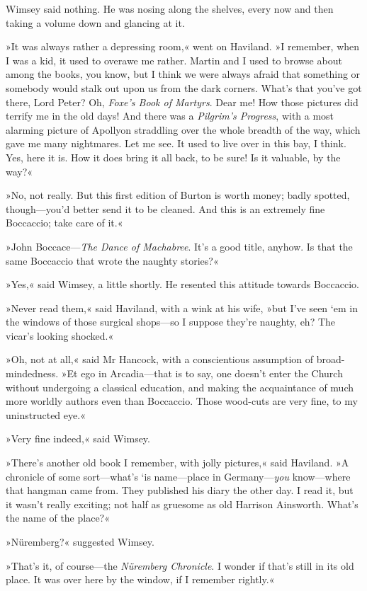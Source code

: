 Wimsey said nothing. He was nosing along the shelves, every now and then taking a volume down and glancing at it.

»It was always rather a depressing room,« went on Haviland. »I remember, when I was a kid, it used to overawe me rather. Martin and I used to browse about among the books, you know, but I think we were always afraid that something or somebody would stalk out upon us from the dark corners. What's that you've got there, Lord Peter? Oh, \textit{Foxe's Book of Martyrs}. Dear me! How those pictures did terrify me in the old days! And there was a \textit{Pilgrim's Progress}, with a most alarming picture of Apollyon straddling over the whole breadth of the way, which gave me many nightmares. Let me see. It used to live over in this bay, I think. Yes, here it is. How it does bring it all back, to be sure! Is it valuable, by the way?«

»No, not really. But this first edition of Burton is worth money; badly spotted, though—you'd better send it to be cleaned. And this is an extremely fine Boccaccio; take care of it.«

»John Boccace—\textit{The Dance of Machabree}. It's a good title, anyhow. Is that the same Boccaccio that wrote the naughty stories?«

»Yes,« said Wimsey, a little shortly. He resented this attitude towards Boccaccio.

»Never read them,« said Haviland, with a wink at his wife, »but I've seen `em in the windows of those surgical shops—so I suppose they're naughty, eh? The vicar's looking shocked.«

»Oh, not at all,« said Mr Hancock, with a conscientious assumption of broad-mindedness. »Et ego in Arcadia—that is to say, one doesn't enter the Church without undergoing a classical education, and making the acquaintance of much more worldly authors even than Boccaccio. Those wood-cuts are very fine, to my uninstructed eye.«

»Very fine indeed,« said Wimsey.

»There's another old book I remember, with jolly pictures,« said Haviland. »A chronicle of some sort—what's `is name—place in Germany—\textit{you} know—where that hangman came from. They published his diary the other day. I read it, but it wasn't really exciting; not half as gruesome as old Harrison Ainsworth. What's the name of the place?«

»Nüremberg?« suggested Wimsey.

»That's it, of course—the \textit{Nüremberg \textit{Chronicle}}. I wonder if that's still in its old place. It was over here by the window, if I remember rightly.«

